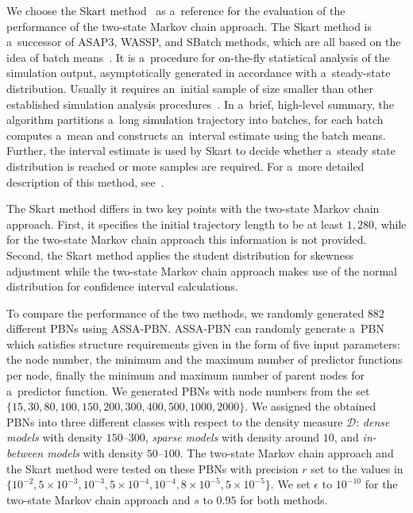 \documentclass[runningheads,a4paper]{llncs}
\begin{document}
We choose the Skart method~\cite{TWLS08} as a~reference for the evaluation of the performance
of the two-state Markov chain approach. The Skart method is a~successor of ASAP3, WASSP, and
SBatch methods, which are all based on the idea of batch means~\cite{TWLS08}. It is
a~procedure for on-the-fly statistical analysis of the simulation output, asymptotically
generated in accordance with a~steady-state distribution. Usually it requires an~initial sample of
size smaller than other established simulation analysis procedures~\cite{TWLS08}. In a~brief,
high-level summary, the algorithm partitions a~long simulation trajectory into batches, for each
batch computes a~mean and constructs an~interval estimate using the batch means. Further,
the interval estimate is used by Skart to decide whether a~steady state distribution is
reached or more samples are required. For a~more detailed description of this method,
see~\cite{TWLS08}.



The Skart method differs in two key points with the two-state Markov chain approach.
First, it specifies the initial trajectory length to be at least $1,280$, while for the two-state
Markov chain approach this information is not provided. Second, the Skart method applies the student distribution for skewness adjustment while the
two-state Markov chain approach makes use of the normal distribution for confidence interval
calculations.

To compare the performance of the two methods, we randomly generated $882$ different PBNs
using {\sf ASSA-PBN}. {\sf ASSA-PBN} can randomly generate a~PBN which satisfies structure
requirements given in the form of five input parameters: the node number, the minimum and the
maximum number of predictor functions per node, finally the minimum and maximum number of
parent nodes for a~predictor function. We generated PBNs with node numbers from the set
$\{15, 30, 80, 100, 150, 200, 300, 400, 500,\allowbreak 1000,\allowbreak 2000\}$. We assigned the
obtained PBNs into three different classes with respect to the density measure $\mathcal{D}$:
\emph{dense models} with density $150$--$300$, \emph{sparse models} with density around $10$, and
\emph{in-between models} with density $50$--$100$. The two-state Markov chain approach and the
Skart method were tested on these PBNs with precision $r$ set to the values in
$\{10^{-2},5\times10^{-3},10^{-3},5\times10^{-4},10^{-4},8\times10^{-5},5\times10^{-5}\}$. We set
$\epsilon$ to $10^{-10}$ for the two-state Markov chain approach and $s$ to $0.95$ for both
methods.
\end{document}
